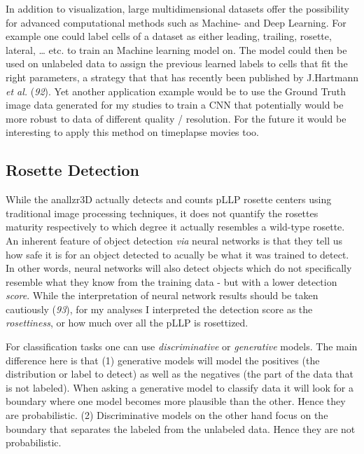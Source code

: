 \documentclass[11pt,singlespacinge,twoside]{reedthesis} %
\theoremstyle{definition}
\theoremstyle{definition}
\theoremstyle{definition}
\theoremstyle{remark}
\begin{document}
In addition to visualization, large multidimensional datasets offer the possibility for advanced computational methods such as Machine- and Deep Learning. For example one could label cells of a dataset as either leading, trailing, rosette, lateral, \ldots{} etc. to train an Machine learning model on. The model could then be used on unlabeled data to assign the previous learned labels to cells that fit the right parameters, a strategy that that has recently been published by J.Hartmann \emph{et al.} (\emph{92}). Yet another application example would be to use the Ground Truth image data generated for my studies to train a CNN that potentially would be more robust to data of different quality / resolution. For the future it would be interesting to apply this method on timeplapse movies too.

\hypertarget{rosette-detection-1}{%
\subsection{Rosette Detection}\label{rosette-detection-1}}

While the anallzr3D actually detects and counts pLLP rosette centers using traditional image processing techniques, it does not quantify the rosettes maturity respectively to which degree it actually resembles a wild-type rosette. An inherent feature of object detection \emph{via} neural networks is that they tell us how safe it is for an object detected to acually be what it was trained to detect. In other words, neural networks will also detect objects which do not specifically resemble what they know from the training data - but with a lower detection \emph{score}. While the interpretation of neural network results should be taken cautiously (\emph{93}), for my analyses I interpreted the detection score as the \emph{rosettiness}, or how much over all the pLLP is rosettized.

For classification tasks one can use \emph{discriminative} or \emph{generative} models. The main difference here is that (1) generative models will model the positives (the distribution or label to detect) as well as the negatives (the part of the data that is not labeled). When asking a generative model to classify data it will look for a boundary where one model becomes more plausible than the other. Hence they are probabilistic. (2) Discriminative models on the other hand focus on the boundary that separates the labeled from the unlabeled data. Hence they are not probabilistic.
\end{document}
